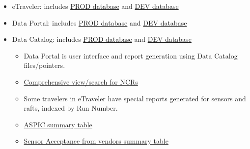 \begin{itemize}
	\item eTraveler: includes \href{https://lsst-camera.slac.stanford.edu/eTraveler/exp/LSST-CAMERA/welcome.jsp?dataSourceMode=Prod}{PROD database} and \href{https://lsst-camera.slac.stanford.edu/eTraveler/exp/LSST-CAMERA/welcome.jsp?dataSourceMode=Dev}{DEV database}
	\item Data Portal: includes \href{https://lsst-camera.slac.stanford.edu/DataPortal/index.jsp?dataSourceMode=Prod}{PROD database} and \href{https://lsst-camera.slac.stanford.edu/DataPortal/index.jsp?dataSourceMode=Dev}{DEV database}
	\item Data Catalog: includes \href{https://srs.slac.stanford.edu/DataCatalog/index.jsp?dataSourceMode=Prod}{PROD database} and \href{https://srs.slac.stanford.edu/DataCatalog/index.jsp?dataSourceMode=Dev}{DEV database}

	\begin{itemize}
		\item Data Portal is user interface and report generation using Data Catalog files/pointers.
		\item \href{https://lsst-camera.slac.stanford.edu/DataPortal/ncrStatus-compact.jsp}{Comprehensive view/search for NCRs}
		\item Some travelers in eTraveler have special reports generated for sensors and rafts, indexed by Run Number.
		\item \href{https://lsst-camera.slac.stanford.edu/DataPortal/aspicStatus.jsp}{ASPIC summary table}
		\item \href{https://lsst-camera.slac.stanford.edu/DataPortal/SensorAcceptance.jsp}{Sensor Acceptance from vendors summary table}
	\end{itemize}


\end{itemize}
